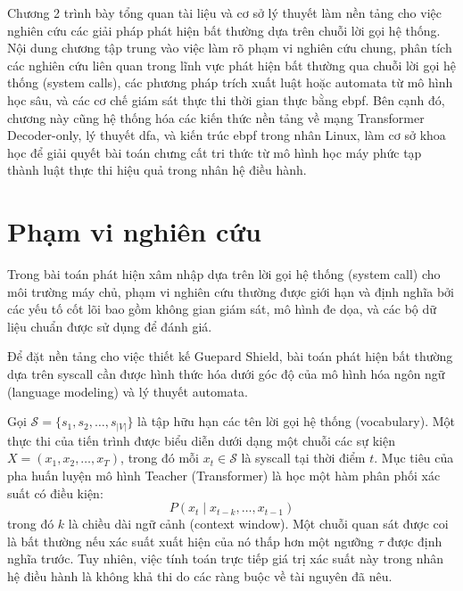 \documentclass[../main.tex]{subfiles}
\begin{document}
Chương 2 trình bày tổng quan tài liệu và cơ sở lý thuyết làm nền tảng
cho việc nghiên cứu các giải pháp phát hiện bất thường dựa trên chuỗi
lời gọi hệ thống. Nội dung chương tập trung vào việc làm rõ phạm vi
nghiên cứu chung, phân tích các nghiên cứu liên quan trong lĩnh vực
phát hiện bất thường qua chuỗi lời gọi hệ thống (system calls), các
phương pháp trích xuất luật hoặc automata từ mô hình học sâu, và các
cơ chế giám sát thực thi thời gian thực bằng \gls{ebpf}. Bên cạnh đó,
chương này cũng hệ thống hóa các kiến thức nền tảng về mạng
Transformer Decoder-only, lý thuyết \gls{dfa},
và kiến trúc \gls{ebpf} trong nhân Linux, làm cơ sở khoa học để giải quyết
bài toán chưng cất tri thức từ mô hình học máy phức tạp thành luật
thực thi hiệu quả trong nhân hệ điều hành.

\section{Phạm vi nghiên cứu}
\label{sec:scope}

Trong bài toán phát hiện xâm nhập dựa trên lời gọi hệ thống (system
call) cho môi trường máy chủ, phạm vi nghiên cứu thường được giới hạn
và định nghĩa bởi các yếu tố cốt lõi bao gồm không gian giám sát, mô
hình đe dọa, và các bộ dữ liệu chuẩn được sử dụng để đánh giá.

Để đặt nền tảng cho việc thiết kế Guepard Shield, bài toán phát hiện
bất thường dựa trên \gls{syscall} cần được hình thức hóa dưới góc độ của
mô hình hóa ngôn ngữ (language modeling) và lý thuyết automata.

Gọi $\mathcal{S} = \{s_1, s_2, \dots, s_{|V|}\}$ là tập hữu hạn các
tên lời gọi hệ thống (vocabulary). Một thực thi của tiến trình được
biểu diễn dưới dạng một chuỗi các sự kiện $X = (x_1, x_2, \dots, x_T)$,
trong đó mỗi $x_t \in \mathcal{S}$ là \gls{syscall} tại thời điểm $t$.
Mục tiêu của pha huấn luyện mô hình Teacher (Transformer) là học một
hàm phân phối xác suất có điều kiện:
\begin{equation}
  P(x_t \mid x_{t-k}, \dots, x_{t-1})
\end{equation}
trong đó $k$ là chiều dài ngữ cảnh (context window). Một chuỗi quan
sát được coi là bất thường nếu xác suất xuất hiện của nó thấp hơn một
ngưỡng $\tau$ được định nghĩa trước. Tuy nhiên, việc tính toán trực
tiếp giá trị xác suất này trong nhân hệ điều hành là không khả thi do
các ràng buộc về tài nguyên đã nêu.
\end{document}
